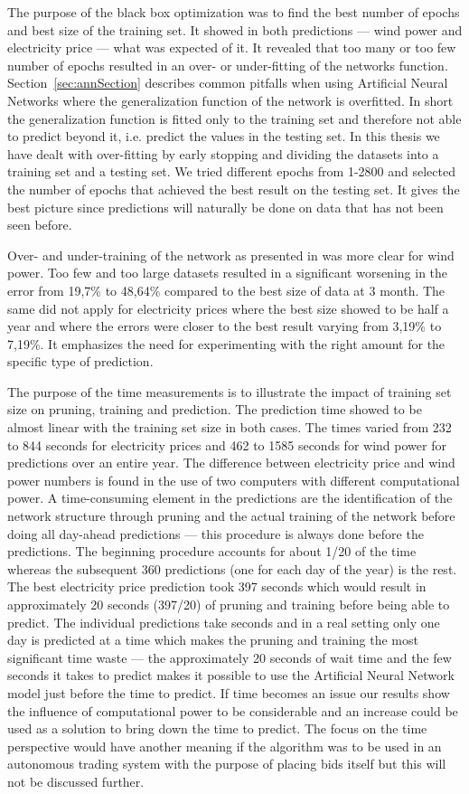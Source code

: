 The purpose of the black box optimization was to find the best number of epochs and best size of the training set. It showed in both predictions --- wind power and electricity price --- what was expected of it. It revealed that too many or too few number of epochs resulted in an over- or under-fitting of the networks function. Section~\ref{sec:annSection} describes common pitfalls when using Artificial Neural Networks where the generalization function of the network is overfitted. In short the generalization function is fitted only to the training set and therefore not able to predict beyond it, i.e. predict the values in the testing set. In this thesis we have dealt with over-fitting by early stopping and dividing the datasets into a training set and a testing set. We tried different epochs from 1-2800 and selected the number of epochs that achieved the best result on the testing set. It gives the best picture since predictions will naturally be done on data that has not been seen before. 

Over- and under-training of the network as presented in\cite{1} was more clear for wind power. Too few  and too large datasets resulted in a significant worsening in the error from 19,7\% to 48,64\% compared to the best size of data at 3 month. The same did not apply for electricity prices where the best size showed to be half a year and where the errors were closer to the best result varying from 3,19\% to 7,19\%. It emphasizes the need for experimenting with the right amount for the specific type of prediction.

The purpose of the time measurements is to illustrate the impact of training set size on pruning, training and prediction. The prediction time showed to be almost linear with the training set size in both cases. The times varied from 232 to 844 seconds for electricity prices and 462 to 1585 seconds for wind power for predictions over an entire year. The difference between electricity price and wind power numbers is found in the use of two computers with different computational power. A time-consuming element in the predictions are the identification of the network structure through pruning and the actual training of the network before doing all day-ahead predictions --- this procedure is always done before the predictions. The beginning procedure accounts for about 1/20 of the time whereas the subsequent 360 predictions (one for each day of the year) is the rest. The best electricity price prediction took 397 seconds which would result in approximately 20 seconds (397/20) of pruning and training before being able to predict. The individual predictions take seconds and in a real setting only one day is predicted at a time which makes the pruning and training the most significant time waste --- the approximately 20 seconds of wait time and the few seconds it takes to predict makes it possible to use the Artificial Neural Network model just before the time to predict. If time becomes an issue our results show the influence of computational power to be considerable and an increase could be used as a solution to bring down the time to predict. The focus on the time perspective would have another meaning if the algorithm was to be used in an autonomous trading system with the purpose of placing bids itself but this will not be discussed further.  
